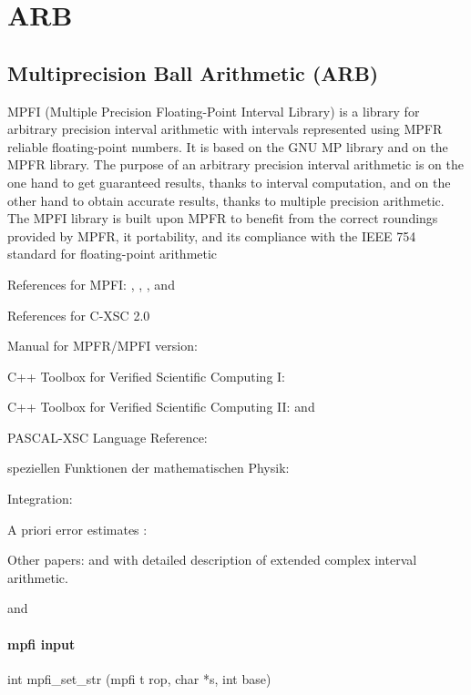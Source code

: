 \chapter{ARB}



\section{Multiprecision Ball Arithmetic (ARB)}
MPFI (Multiple Precision Floating-Point Interval Library) is a library for arbitrary precision interval arithmetic with intervals represented using MPFR reliable floating-point numbers. It is based on the GNU MP library and on the MPFR library. The purpose of an arbitrary precision interval arithmetic is on the one hand to get guaranteed results, thanks to interval computation, and on the other hand to obtain accurate results, thanks to multiple precision arithmetic. The MPFI library is built upon MPFR to benefit from the correct roundings provided by MPFR, it portability, and its compliance with the IEEE 754 standard for floating-point arithmetic

References for MPFI: \cite{MPFI_2005}, \cite{Moore_2009},  \cite{Hayer2003},  and \cite{INTLAB_1999}

References for C-XSC 2.0  \cite{Hofschuster2004}

Manual for MPFR/MPFI version: \cite{Blomquist2012}


C++ Toolbox for Verified Scientific Computing I:   \cite{Hammer1995}

C++ Toolbox for Verified Scientific Computing II:   \cite{Kramer1994} and \cite{Kramer2006}

PASCAL-XSC Language Reference: \cite{Klatte1991}

speziellen Funktionen der mathematischen Physik: \cite{Hofschuster2000}

Integration: \cite{Wedner2000}


A priori error estimates : \cite{Blomquist2005}

Other papers:    \cite{Blomquist2008a} and  \cite{Blomquist2008} with detailed description of extended complex interval arithmetic.

and   \cite{Kramer2012}





\subsubsection{mpfi input}
int mpfi\_set\_str (mpfi t rop, char *s, int base)

